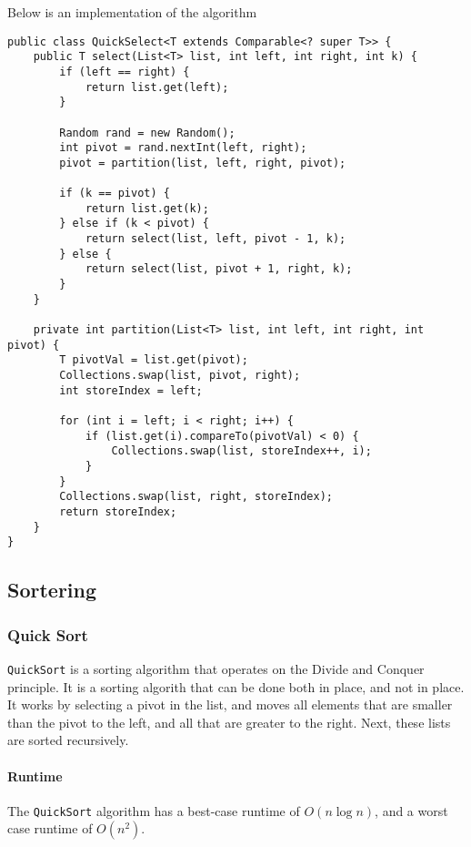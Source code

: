 \documentclass{article}
\begin{document}
Below is an implementation of the algorithm

\begin{lstlisting}
public class QuickSelect<T extends Comparable<? super T>> {
    public T select(List<T> list, int left, int right, int k) {
        if (left == right) {
            return list.get(left);
        }

        Random rand = new Random();
        int pivot = rand.nextInt(left, right);
        pivot = partition(list, left, right, pivot);

        if (k == pivot) {
            return list.get(k);
        } else if (k < pivot) {
            return select(list, left, pivot - 1, k);
        } else {
            return select(list, pivot + 1, right, k);
        }
    }

    private int partition(List<T> list, int left, int right, int pivot) {
        T pivotVal = list.get(pivot);
        Collections.swap(list, pivot, right);
        int storeIndex = left;

        for (int i = left; i < right; i++) {
            if (list.get(i).compareTo(pivotVal) < 0) {
                Collections.swap(list, storeIndex++, i);
            }
        }
        Collections.swap(list, right, storeIndex);
        return storeIndex;
    }
}
\end{lstlisting}
\newpage
    \subsection{Sortering}
    \subsubsection{Quick Sort}
    \texttt{QuickSort} is a sorting algorithm that operates on the Divide and Conquer principle. It is a sorting algorith that can be done both in place, and not in place. It works by selecting a pivot in the list, and moves all elements that are smaller than the pivot to the left, and all that are greater to the right. Next, these lists are sorted recursively.
\medskip

\paragraph{Runtime} The \texttt{QuickSort} algorithm has a best-case runtime of \( O(n \log n) \), and a worst case runtime of \( O\left( n^2 \right) \).
\medskip
\end{document}

